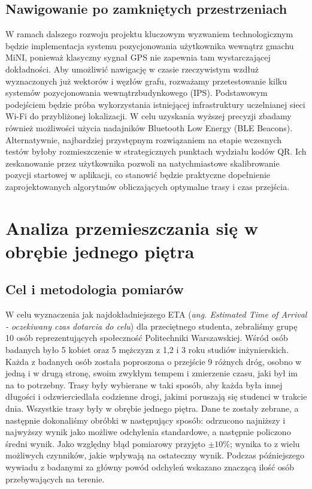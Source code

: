 \documentclass[14pt,a4paper]{extarticle}
\begin{document}
\subsection{Nawigowanie po zamkniętych przestrzeniach}
W ramach dalszego rozwoju projektu kluczowym wyzwaniem technologicznym będzie implementacja systemu pozycjonowania użytkownika wewnątrz gmachu MiNI, ponieważ klasyczny sygnał GPS nie zapewnia tam wystarczającej dokładności. Aby umożliwić nawigację w czasie rzeczywistym wzdłuż wyznaczonych już wektorów i węzłów grafu, rozważamy przetestowanie kilku systemów pozycjonowania wewnątrzbudynkowego (IPS). Podstawowym podejściem będzie próba wykorzystania istniejącej infrastruktury uczelnianej sieci Wi-Fi do przybliżonej lokalizacji. W celu uzyskania wyższej precyzji zbadamy również możliwości użycia nadajników Bluetooth Low Energy (BLE Beacons). Alternatywnie, najbardziej przystępnym rozwiązaniem na etapie wczesnych testów byłoby rozmieszczenie w strategicznych punktach wydziału kodów QR. Ich zeskanowanie przez użytkownika pozwoli na natychmiastowe skalibrowanie pozycji startowej w aplikacji, co stanowić będzie praktyczne dopełnienie zaprojektowanych algorytmów obliczających optymalne trasy i czas przejścia.

\section{Analiza przemieszczania się w obrębie jednego piętra}

\subsection{Cel i metodologia pomiarów}
W celu wyznaczenia jak najdokładniejszego ETA (\textit{ang. Estimated Time of Arrival - oczekiwany czas dotarcia do celu}) dla przeciętnego studenta, zebraliśmy grupę 10 osób reprezentujących społeczność Politechniki Warszawskiej. Wśród osób badanych było 5 kobiet oraz 5 mężczyzn z 1,2 i 3 roku studiów inżynierskich. Każda z badanych osób została poproszona o przejście 9 różnych dróg, osobno w jedną i w drugą stronę, swoim zwykłym tempem i zmierzenie czasu, jaki był im na to potrzebny. Trasy były wybierane w taki sposób, aby każda była innej długości i odzwierciedlała codzienne drogi, jakimi poruszają się studenci w trakcie dnia. Wszystkie trasy były w obrębie jednego piętra. Dane te zostały zebrane, a następnie dokonaliśmy obróbki w następujący sposób: odrzucono najniższy i najwyższy wynik jako możliwe odchylenia standardowe, a następnie policzono średni wynik. Jako względny błąd pomiarowy przyjęto $\pm 10\%$; wynika to z wielu możliwych czynników, jakie wpływają na ostateczny wynik. Podczas późniejszego wywiadu z badanymi za główny powód odchyleń wskazano znaczącą ilość osób przebywających na terenie.
\end{document}
